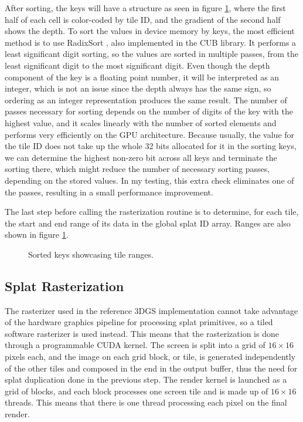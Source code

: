 After sorting, the keys will have a structure as seen in figure \ref{fig:sortedkey}, where the first half of each cell is color-coded by tile ID, and the gradient of the second half shows the depth. To sort the values in device memory by keys, the most efficient method is to use RadixSort \cite{radix_sort}, also implemented in the CUB library. It performs a least significant digit sorting, so the values are sorted in multiple passes, from the least significant digit to the most significant digit. Even though the depth component of the key is a floating point number, it will be interpreted as an integer, which is not an issue since the depth always has the same sign, so ordering as an integer representation produces the same result. The number of passes necessary for sorting depends on the number of digits of the key with the highest value, and it scales linearly with the number of sorted elements and performs very efficiently on the GPU architecture. Because usually, the value for the tile ID does not take up the whole 32 bits allocated for it in the sorting keys, we can determine the highest non-zero bit across all keys and terminate the sorting there, which might reduce the number of necessary sorting passes, depending on the stored values. In my testing, this extra check eliminates one of the passes, resulting in a small performance improvement.

The last step before calling the rasterization routine is to determine, for each tile, the start and end range of its data in the global splat ID array. Ranges are also shown in figure \ref{fig:sortedkey}.
\begin{figure}[H]
    \centering
    
    \caption{Sorted keys showcasing tile ranges.}
    \label{fig:sortedkey}
\end{figure}

\subsection{Splat Rasterization}
The rasterizer used in the reference 3DGS implementation cannot take advantage of the hardware graphics pipeline for processing splat primitives, so a tiled software rasterizer is used instead. This means that the rasterization is done through a programmable CUDA kernel. The screen is split into a grid of $16 \times 16$ pixels each, and the image on each grid block, or tile, is generated independently of the other tiles and composed in the end in the output buffer, thus the need for splat duplication done in the previous step. The render kernel is launched as a grid of blocks, and each block processes one screen tile and is made up of $16 \times 16$ threads. This means that there is one thread processing each pixel on the final render. 

